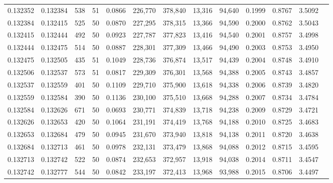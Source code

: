 \begin{tabular}{rrrrrrrrrrrrr}
0.132352 & 0.132384 &   538 &  51 &                                     0.0866 & 226,770 & 378,840 &  13,316 &  94,640 & 0.1999 & 0.8767 & 3.5092 \\
0.132384 & 0.132415 &   525 &  50 &                                     0.0870 & 227,295 & 378,315 &  13,366 &  94,590 & 0.2000 & 0.8762 & 3.5043 \\
0.132415 & 0.132444 &   492 &  50 &                                     0.0923 & 227,787 & 377,823 &  13,416 &  94,540 & 0.2001 & 0.8757 & 3.4998 \\
0.132444 & 0.132475 &   514 &  50 &                                     0.0887 & 228,301 & 377,309 &  13,466 &  94,490 & 0.2003 & 0.8753 & 3.4950 \\
0.132475 & 0.132505 &   435 &  51 &                                     0.1049 & 228,736 & 376,874 &  13,517 &  94,439 & 0.2004 & 0.8748 & 3.4910 \\
0.132506 & 0.132537 &   573 &  51 &                                     0.0817 & 229,309 & 376,301 &  13,568 &  94,388 & 0.2005 & 0.8743 & 3.4857 \\
0.132537 & 0.132559 &   401 &  50 &                                     0.1109 & 229,710 & 375,900 &  13,618 &  94,338 & 0.2006 & 0.8739 & 3.4820 \\
0.132559 & 0.132584 &   390 &  50 &                                     0.1136 & 230,100 & 375,510 &  13,668 &  94,288 & 0.2007 & 0.8734 & 3.4784 \\
0.132584 & 0.132626 &   671 &  50 &                                     0.0693 & 230,771 & 374,839 &  13,718 &  94,238 & 0.2009 & 0.8729 & 3.4721 \\
0.132626 & 0.132653 &   420 &  50 &                                     0.1064 & 231,191 & 374,419 &  13,768 &  94,188 & 0.2010 & 0.8725 & 3.4683 \\
0.132653 & 0.132684 &   479 &  50 &                                     0.0945 & 231,670 & 373,940 &  13,818 &  94,138 & 0.2011 & 0.8720 & 3.4638 \\
0.132684 & 0.132713 &   461 &  50 &                                     0.0978 & 232,131 & 373,479 &  13,868 &  94,088 & 0.2012 & 0.8715 & 3.4595 \\
0.132713 & 0.132742 &   522 &  50 &                                     0.0874 & 232,653 & 372,957 &  13,918 &  94,038 & 0.2014 & 0.8711 & 3.4547 \\
0.132742 & 0.132777 &   544 &  50 &                                     0.0842 & 233,197 & 372,413 &  13,968 &  93,988 & 0.2015 & 0.8706 & 3.4497 \\

\end{tabular}
